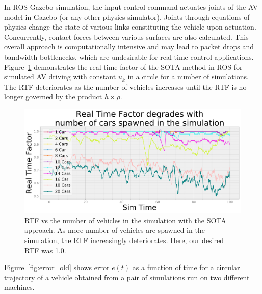 \documentclass[aps,pra,twocolumn,notitlepage,nofootinbib,superscriptaddress]{revtex4-1}
\begin{document}
In ROS-Gazebo simulation, the input control command actuates joints of the AV model in Gazebo (or any other physics simulator). Joints through equations of physics change the state of various links constituting the vehicle upon actuation. Concurrently, contact forces between various surfaces are also calculated. This overall approach is computationally intensive and may lead to packet drops and bandwidth bottlenecks, which are undesirable for real-time control applications. Figure~\ref{fig:RTFvsnCars} demonstrates the real-time factor of the SOTA method in ROS for simulated AV driving with constant $u_k$ in a circle for a number of simulations. The RTF deteriorates as the number of vehicles increases until the RTF is no longer governed by the product $h \times \rho$.
\begin{figure}[h]
    \centering
    \includegraphics[clip,width=0.95\linewidth]{RTFvsnCars.png}
    \caption{RTF vs the number of vehicles in the simulation with the SOTA approach. As more number of vehicles are spawned in the simulation, the RTF increasingly deteriorates. Here, our desired RTF was 1.0.}
    \label{fig:RTFvsnCars}
\end{figure}
Figure~\ref{fig:error_old} shows error $e(t)$ as a function of time for a circular trajectory of a vehicle obtained from a pair of simulations run on two different machines.
\end{document}
